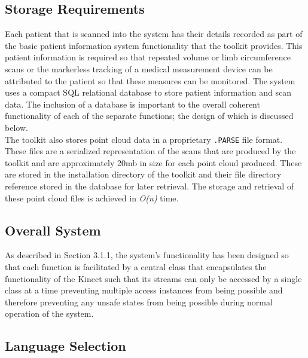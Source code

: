 \subsection{Storage Requirements}

Each patient that is scanned into the system has their details recorded as part of the basic patient information system functionality that the toolkit provides. This patient information is required so that repeated volume or limb circumference scans or the markerless tracking of a medical measurement device can be attributed to the patient so that these measures can be monitored. The system uses a compact SQL relational database to store patient information and scan data. The inclusion of a database is important to the overall coherent functionality of each of the separate functions; the design of which is discussed below. \\



The toolkit also stores point cloud data in a proprietary \texttt{.PARSE} file format. These files are a serialized representation of the scans that are produced by the toolkit and are approximately 20mb in size for each point cloud produced. These are stored in the installation directory of the toolkit and their file directory reference stored in the database for later retrieval. The storage and retrieval of these point cloud files is achieved in \emph{O(n)} time.

\newpage

\subsection{Overall System}

As described in Section 3.1.1, the system's functionality has been designed so that each function is facilitated by a central class that encapsulates the functionality of the Kinect such that its streams can only be accessed by a single class at a time preventing multiple access instances from being possible and therefore preventing any unsafe states from being possible during normal operation of the system. \\

\subsection{Language Selection}

